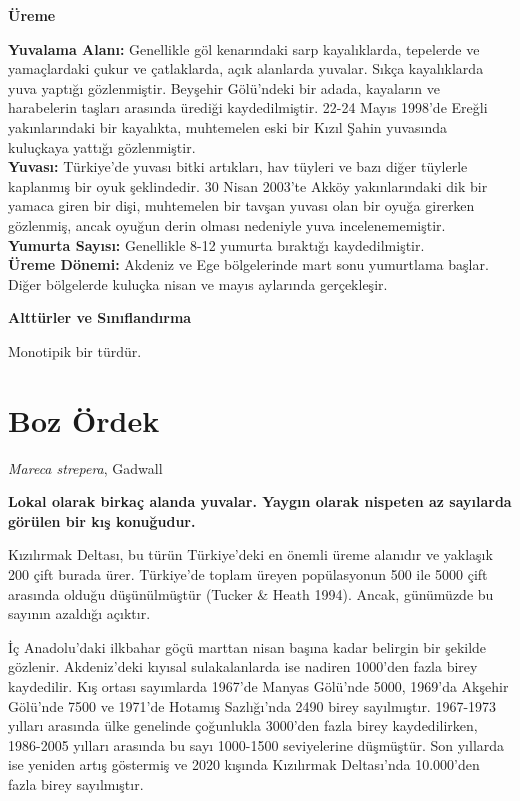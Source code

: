 \documentclass[
  letterpaper,
  DIV=11,
  numbers=noendperiod]{scrreprt}
\begin{document}
\textbf{Üreme}

\textbf{Yuvalama Alanı:} Genellikle göl kenarındaki sarp kayalıklarda,
tepelerde ve yamaçlardaki çukur ve çatlaklarda, açık alanlarda yuvalar.
Sıkça kayalıklarda yuva yaptığı gözlenmiştir. Beyşehir Gölü'ndeki bir
adada, kayaların ve harabelerin taşları arasında ürediği kaydedilmiştir.
22-24 Mayıs 1998'de Ereğli yakınlarındaki bir kayalıkta, muhtemelen eski
bir Kızıl Şahin yuvasında kuluçkaya yattığı gözlenmiştir.\\
\textbf{Yuvası:} Türkiye'de yuvası bitki artıkları, hav tüyleri ve bazı
diğer tüylerle kaplanmış bir oyuk şeklindedir. 30 Nisan 2003'te Akköy
yakınlarındaki dik bir yamaca giren bir dişi, muhtemelen bir tavşan
yuvası olan bir oyuğa girerken gözlenmiş, ancak oyuğun derin olması
nedeniyle yuva incelenememiştir.\\
\textbf{Yumurta Sayısı:} Genellikle 8-12 yumurta bıraktığı
kaydedilmiştir.\\
\textbf{Üreme Dönemi:} Akdeniz ve Ege bölgelerinde mart sonu yumurtlama
başlar. Diğer bölgelerde kuluçka nisan ve mayıs aylarında gerçekleşir.

\textbf{Alttürler ve Sınıflandırma}

Monotipik bir türdür.

\section{Boz Ördek}\label{boz-uxf6rdek}

\emph{Mareca strepera}, Gadwall

\textbf{Lokal olarak birkaç alanda yuvalar. Yaygın olarak nispeten az
sayılarda görülen bir kış konuğudur.}

Kızılırmak Deltası, bu türün Türkiye'deki en önemli üreme alanıdır ve
yaklaşık 200 çift burada ürer. Türkiye'de toplam üreyen popülasyonun 500
ile 5000 çift arasında olduğu düşünülmüştür (Tucker \& Heath 1994).
Ancak, günümüzde bu sayının azaldığı açıktır.

İç Anadolu'daki ilkbahar göçü marttan nisan başına kadar belirgin bir
şekilde gözlenir. Akdeniz'deki kıyısal sulakalanlarda ise nadiren
1000'den fazla birey kaydedilir. Kış ortası sayımlarda 1967'de Manyas
Gölü'nde 5000, 1969'da Akşehir Gölü'nde 7500 ve 1971'de Hotamış
Sazlığı'nda 2490 birey sayılmıştır. 1967-1973 yılları arasında ülke
genelinde çoğunlukla 3000'den fazla birey kaydedilirken, 1986-2005
yılları arasında bu sayı 1000-1500 seviyelerine düşmüştür. Son yıllarda
ise yeniden artış göstermiş ve 2020 kışında Kızılırmak Deltası'nda
10.000'den fazla birey sayılmıştır.
\end{document}
